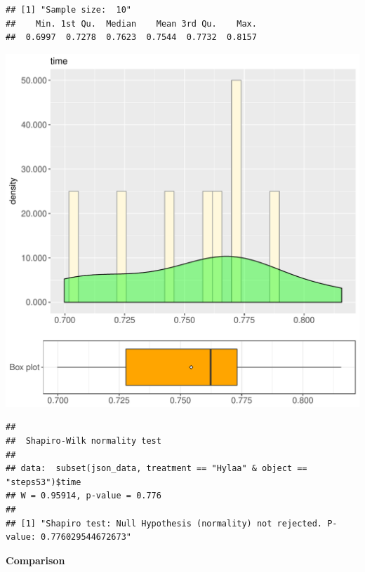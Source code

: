 \documentclass{article}\usepackage[]{graphicx}\usepackage[]{color}
\makeatletter
\def\maxwidth{ %
  \ifdim\Gin@nat@width>\linewidth
    \linewidth
  \else
    \Gin@nat@width
  \fi
}
\newenvironment{kframe}{%
 \def\at@end@of@kframe{}%
 \ifinner\ifhmode%
  \def\at@end@of@kframe{\end{minipage}}%
  \begin{minipage}{\columnwidth}%
 \fi\fi%
 \def\FrameCommand##1{\hskip\@totalleftmargin \hskip-\fboxsep
 \colorbox{shadecolor}{##1}\hskip-\fboxsep
     \hskip-\linewidth \hskip-\@totalleftmargin \hskip\columnwidth}%
 \MakeFramed {\advance\hsize-\width
   \@totalleftmargin\z@ \linewidth\hsize
   \@setminipage}}%
 {\par\unskip\endMakeFramed%
 \at@end@of@kframe}
\newenvironment{knitrout}{}{} %
\makeatother
\begin{document}
\begin{knitrout}
\color{fgcolor}\begin{kframe}
\begin{verbatim}
## [1] "Sample size:  10"
##    Min. 1st Qu.  Median    Mean 3rd Qu.    Max. 
##  0.6997  0.7278  0.7623  0.7544  0.7732  0.8157
\end{verbatim}
\end{kframe}
\includegraphics[width=\maxwidth]{figure/RH2_Hylaa_steps53-1} 
\begin{kframe}\begin{verbatim}
## 
## 	Shapiro-Wilk normality test
## 
## data:  subset(json_data, treatment == "Hylaa" & object == "steps53")$time
## W = 0.95914, p-value = 0.776
## 
## [1] "Shapiro test: Null Hypothesis (normality) not rejected. P-value: 0.776029544672673"
\end{verbatim}
\end{kframe}
\end{knitrout}
  
 \textbf{Comparison}
  
\end{document}
